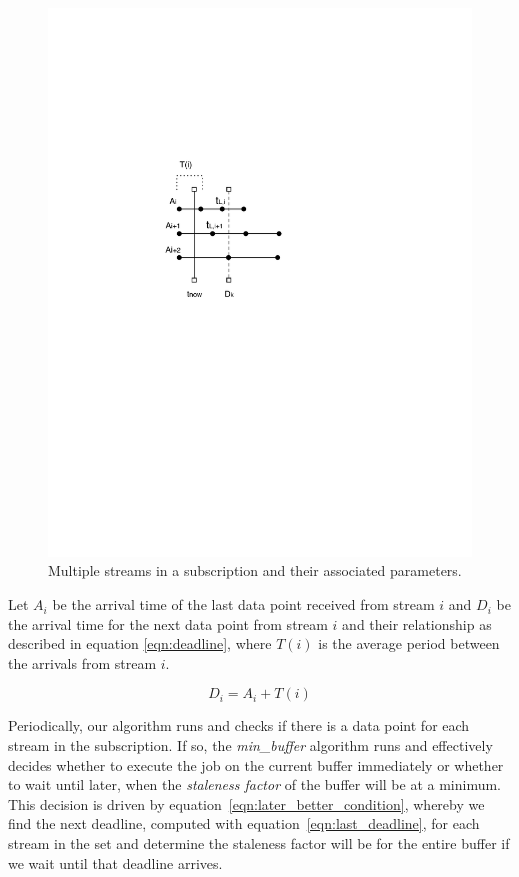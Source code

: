 \begin{figure}[t!] %
\centering
\includegraphics[width=0.75\columnwidth]{figs/min_buffer}
\caption{Multiple streams in a subscription and their associated parameters.}
\label{fig:min_buffer}
\end{figure}

Let $A_{i}$ be the arrival time of the last data point received from stream $i$ and $D_{i}$ be the arrival time for the next data point from stream $i$
and their relationship as described in equation \ref{eqn:deadline}, where $T(i)$ is the average period between the arrivals from stream $i$.

\begin{equation}
D_{i} = A_{i} + T(i)
\label{eqn:deadline}
\end{equation}


Periodically, our algorithm runs and checks if there is a data point for each stream in the subscription.  If so, the \emph{min\_buffer} algorithm runs 
and effectively decides whether to execute the job on the current buffer immediately or whether to wait until later, when the \emph{staleness factor} of
the buffer will be at a minimum.  This decision is driven by equation~\ref{eqn:later_better_condition}, whereby we find the next deadline, computed with
equation~\ref{eqn:last_deadline}, for each stream in the set and determine the staleness factor will be for the entire buffer if we wait until that deadline arrives.

